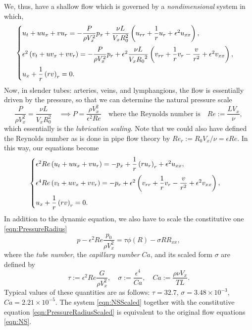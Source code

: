 \documentclass[12pt,a4paper]{article}
\begin{document}
We, thus, have a shallow flow which is governed by a \textit{nondimensional} system in which, 
\begin{equation}\label{eqn:NS}
	\begin{cases}
		u_t + u u_x + v u_r = - \dfrac{P}{\rho V_x^2} p_x + \dfrac{\nu L}{V_x R_0^2} \left(u_{rr}+ \dfrac{1}{r} u_r + \epsilon^2 u_{xx}\right), \vspace{6pt}\\
		\epsilon^2 \left(v_t + u v_x + v v_r \right) = - \dfrac{P}{\rho V_x^2} p_r + \epsilon^2\dfrac{\nu L}{V_x {R_0}^2} \left(v_{rr}+\dfrac{1}{r} v_r - \dfrac{v}{r^2} + \epsilon^2 v_{xx}\right), \vspace{6pt}\\
		u_x + \dfrac{1}{r} \left(r v\right)_r = 0. \\
	\end{cases}
\end{equation}
Now, in slender tubes: arteries, veins, and lymphangions, the flow is essentially driven by the pressure, so that we can determine the natural pressure scale 
\begin{equation}
	\dfrac{P}{\rho V_x^2} = \dfrac{\nu L}{V_x R_0^2} \quad \implies P = \frac{\rho V_x^2}{ \epsilon^2 Re} \quad \text{where the Reynolds number is} \quad Re := \frac{L V_x}{\nu}, 
\end{equation}
which essentially is the \textit{lubrication scaling}. Note that we could also have defined the Reynolds number as is done in pipe flow theory by $Re_r := R_0 V_x/\nu = \epsilon Re$. In this way, our equations become
\begin{equation}\label{eqn:NSScaled}
	\begin{cases}
		\epsilon^2 Re\left(u_t + u u_x + v u_r\right) = - p_x + \dfrac{1}{r}\left(r u_r\right)_r + \epsilon^2 u_{xx}, \vspace{6pt}\\
		\epsilon^4 Re \left(v_t + u v_x + v v_r \right) = - p_r + \epsilon^2 \left(v_{rr}+\dfrac{1}{r} v_r - \dfrac{v}{r^2} + \epsilon^2 v_{xx}\right), \vspace{6pt}\\
		u_x + \dfrac{1}{r} \left(r v\right)_r = 0. \\
	\end{cases}
\end{equation}
In addition to the dynamic equation, we also have to scale the constitutive one \eqref{eqn:PressureRadius}
\begin{equation}\label{eqn:PressureRadiusScaled}
	p - \epsilon^2 Re\frac{p_0}{\rho V_x^2} = \tau \phi(R) - \sigma RR_{xx},
\end{equation}
where the \textit{tube number}, the \textit{capillary number} $Ca$, and its scaled form $\sigma$ are defined by
\begin{equation}
	\tau := \epsilon^2 Re\frac{G}{\rho V_x^2}, \quad \sigma := \frac{\epsilon^4}{Ca}, \quad Ca := \frac{\rho \nu V_x}{T L}.
\end{equation}
Typical values of these quantities are as follows: $\tau = 32.7$, $\sigma=3.48 \times 10^{-3}$, $Ca=2.21 \times 10^{-5}$. The system \eqref{eqn:NSScaled} together with the constitutive equation \eqref{eqn:PressureRadiusScaled} is equivalent to the original flow equations \eqref{eqn:NS}. 
\end{document}
